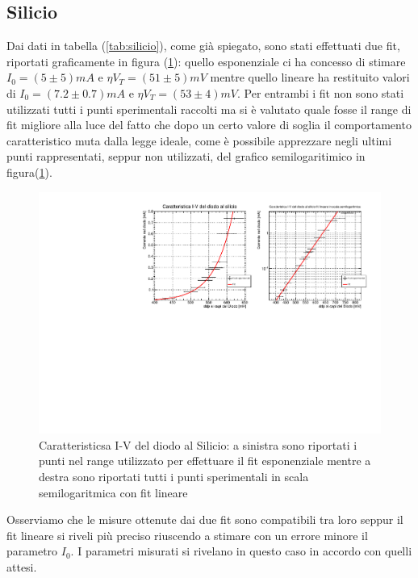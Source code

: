 \documentclass[]{article}
\begin{document}
\subsection{Silicio}
Dai dati in tabella (\ref{tab:silicio}), come già spiegato, sono stati effettuati due fit, riportati graficamente in figura (\ref{fig:silicio}): quello esponenziale ci ha concesso di stimare $I_0=(5\pm5)mA$ e $\eta V_T=(51\pm5)mV$ mentre quello lineare ha restituito valori di $I_0=(7.2\pm0.7)mA$ e $\eta V_T=(53\pm4)mV$. Per entrambi i fit non sono stati utilizzati tutti i punti sperimentali raccolti ma si è valutato quale fosse il range di fit migliore alla luce del fatto che dopo un certo valore di soglia il comportamento caratteristico muta dalla legge ideale, come è possibile apprezzare negli ultimi punti rappresentati, seppur non utilizzati, del grafico semilogaritimico in figura(\ref{fig:silicio}). 
\begin{figure}[H]
	\centering
	\includegraphics[width=0.9\linewidth]{../Silicio/canvas}
	\caption{Caratteristicsa I-V del diodo al Silicio: a sinistra sono riportati i punti nel range utilizzato per effettuare il fit esponenziale mentre a destra sono riportati tutti i punti sperimentali in scala semilogaritmica con fit lineare}
	\label{fig:silicio}
\end{figure}
Osserviamo che le misure ottenute dai due fit sono compatibili tra loro seppur il fit lineare si riveli più preciso riuscendo a stimare con un errore minore il parametro $I_0$.
I parametri misurati si rivelano in questo caso in accordo con quelli attesi.
\end{document}
